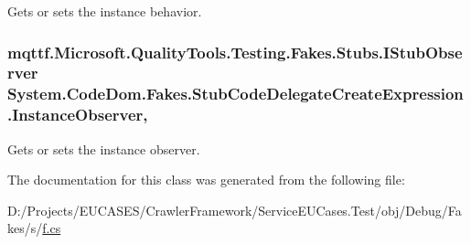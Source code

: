 Gets or sets the instance behavior.

\hypertarget{class_system_1_1_code_dom_1_1_fakes_1_1_stub_code_delegate_create_expression_aea8dce0aaa32aca1ddb142fc230d545e}{
\subsubsection[{Instance\-Observer}]{\setlength{\rightskip}{0pt plus 5cm}mqttf.\-Microsoft.\-Quality\-Tools.\-Testing.\-Fakes.\-Stubs.\-I\-Stub\-Observer System.\-Code\-Dom.\-Fakes.\-Stub\-Code\-Delegate\-Create\-Expression.\-Instance\-Observer\hspace{0.3cm}{\ttfamily [get]}, {\ttfamily [set]}}}\label{class_system_1_1_code_dom_1_1_fakes_1_1_stub_code_delegate_create_expression_aea8dce0aaa32aca1ddb142fc230d545e}


Gets or sets the instance observer.



The documentation for this class was generated from the following file\-:\begin{DoxyCompactItemize}
\item 
D\-:/\-Projects/\-E\-U\-C\-A\-S\-E\-S/\-Crawler\-Framework/\-Service\-E\-U\-Cases.\-Test/obj/\-Debug/\-Fakes/s/\hyperlink{s_2f_8cs}{f.\-cs}\end{DoxyCompactItemize}
